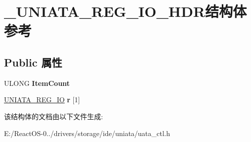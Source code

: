 \hypertarget{struct___u_n_i_a_t_a___r_e_g___i_o___h_d_r}{}\section{\+\_\+\+U\+N\+I\+A\+T\+A\+\_\+\+R\+E\+G\+\_\+\+I\+O\+\_\+\+H\+D\+R结构体 参考}
\label{struct___u_n_i_a_t_a___r_e_g___i_o___h_d_r}
\subsection*{Public 属性}
\begin{DoxyCompactItemize}
\item 
\mbox{\label{struct___u_n_i_a_t_a___r_e_g___i_o___h_d_r_aa9658df0624e8228f27232be9e0413f7}} 
U\+L\+O\+NG {\bfseries Item\+Count}
\item 
\mbox{\label{struct___u_n_i_a_t_a___r_e_g___i_o___h_d_r_a06b8b2f7cb9da32236e516af0985c88e}} 
\hyperlink{struct___u_n_i_a_t_a___r_e_g___i_o}{U\+N\+I\+A\+T\+A\+\_\+\+R\+E\+G\+\_\+\+IO} {\bfseries r} \mbox{[}1\mbox{]}
\end{DoxyCompactItemize}


该结构体的文档由以下文件生成\+:\begin{DoxyCompactItemize}
\item 
E\+:/\+React\+O\+S-\/0../drivers/storage/ide/uniata/uata\+\_\+ctl.\+h\end{DoxyCompactItemize}
